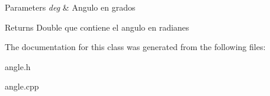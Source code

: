 \begin{DoxyParams}{Parameters}
{\em deg} & Angulo en grados \\
\hline
\end{DoxyParams}
\begin{DoxyReturn}{Returns}
Double que contiene el angulo en radianes 
\end{DoxyReturn}


The documentation for this class was generated from the following files\+:\begin{DoxyCompactItemize}
\item 
angle.\+h\item 
angle.\+cpp\end{DoxyCompactItemize}
